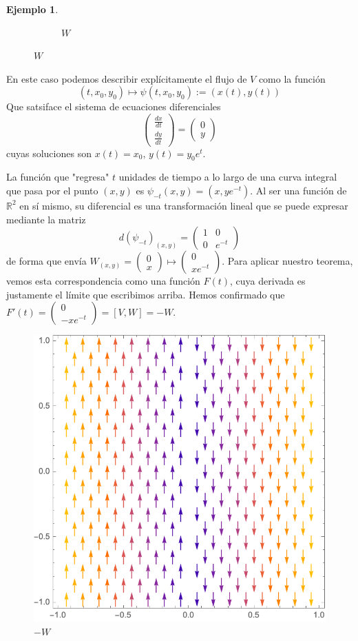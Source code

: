 \documentclass[spanish]{book}
\theoremstyle{definition}
\newtheorem*{ejem}{Ejemplo}
\newcommand{\R}{\mathbb{R}}
\begin{document}
\begin{ejem}
\begin{figure}[H]
\begin{subfigure}{0.5\linewidth}
				\caption*{$W$}
			\end{subfigure}
		\end{figure}
		En este caso podemos describir explícitamente el flujo de $V$ como la función
		\[(t,x_0,y_0)\mapsto\psi(t,x_0,y_0):=(x(t),y(t))\]
		Que satsiface el sistema de ecuaciones diferenciales
		\[\begin{pmatrix}
			\frac{dx}{dt}\\
			\frac{dy}{dt}
		\end{pmatrix}=
		\begin{pmatrix}
			0\\
			y
		\end{pmatrix}\]
		cuyas soluciones son $x(t)=x_0$, $y(t)=y_0e^t$.
		
		La función que "regresa" $t$ unidades de tiempo a lo largo de una curva integral que pasa por el punto $(x,y)$ es $\psi_{-t}(x,y)=(x,ye^{-t})$. Al ser una función de $\R^2$ en sí mismo, su diferencial es una transformación lineal que se puede expresar mediante la matriz
		\[d(\psi_{-t})_{(x,y)}=\begin{pmatrix}
			1&0\\
			0&e^{-t}
		\end{pmatrix}\]
		de forma que envía $W_{(x,y)}=\begin{pmatrix}0\\x\end{pmatrix}\mapsto\begin{pmatrix}0\\xe^{-t}\end{pmatrix}$. Para aplicar nuestro teorema, vemos esta correspondencia como una función $F(t)$, cuya derivada es justamente el límite que escribimos arriba. Hemos confirmado que
		$F'(t)=\begin{pmatrix}
			0\\-xe^{-t}
		\end{pmatrix}=[V,W]=-W$.
		\begin{figure}[H]
			\centering
			\includegraphics[width=0.45\linewidth]{fig8}
			\caption*{$-W$}
		\end{figure}
	\end{ejem}
\end{document}
